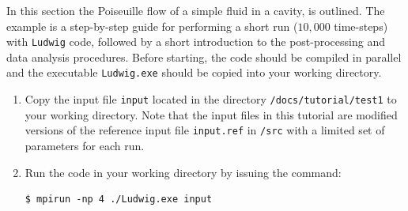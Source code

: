 \documentclass[11pt,twoside,a4paper]{article}
\begin{document}
In this section the Poiseuille flow of a simple fluid in a cavity, is outlined. 
The example is a step-by-step guide for performing a short run ($10,000$ time-steps) 
with \texttt{Ludwig} code, followed by a short introduction to the post-processing 
and data analysis procedures. Before starting, the code should be compiled in 
parallel and the executable \texttt{Ludwig.exe} should be copied into your working directory.
\begin{enumerate}
\item Copy the input file \texttt{input} located in the directory \texttt{/docs/tutorial/test1} 
to your working directory. Note that the input files in this tutorial are modified versions of the 
reference input file \texttt{input.ref} in \texttt{/src} with a limited set of parameters
for each run.
\item Run the code in your working directory by issuing the command:
\begin{lstlisting}
$ mpirun -np 4 ./Ludwig.exe input
\end{lstlisting}


\end{enumerate}
\end{document}
